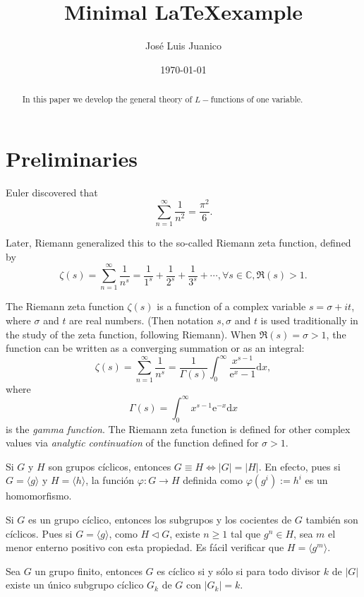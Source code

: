 \documentclass{article}
\title{Minimal \LaTeX example}
\author{José Luis Juanico}
\date{\today}
\begin{document}
\maketitle
\begin{abstract}
    \noindent In this paper we develop the general theory of $L-$functions of one variable. \lipsum[1][1-3]
\end{abstract}

\section{Preliminaries}

Euler discovered that
\begin{equation}
    \sum_{n=1}^{\infty} \frac{1}{n^2} = \frac{\pi^2}{6}.
\end{equation}

Later, Riemann generalized this to the so-called Riemann zeta function, defined by
\begin{equation}
    \zeta(s) = \sum_{n=1}^{\infty} \frac{1}{n^s} = \frac{1}{1^s}+\frac{1}{2^s}+\frac{1}{3^s}+\cdots, \forall s \in \mathbb{C}, \Re(s) > 1.
\end{equation}

The Riemann zeta function $\zeta(s)$ is a function of a complex variable $s=\sigma+i t$, where $\sigma$ and $t$ are real numbers. (Then notation $s,\sigma$ and $t$ is used traditionally in the study of the zeta function, following Riemann). When $\Re(s)=\sigma>1$, the function can be written as a converging summation or as an integral:
\begin{equation}
    \zeta(s) = \sum_{n=1}^{\infty} \frac{1}{n^s} = \frac{1}{\Gamma(s)} \int_{0}^{\infty} \frac{x^{s-1}}{\mathrm{e}^x-1} \mathrm{d} x,
\end{equation}
where
\begin{equation}
    \Gamma(s) = \int_{0}^{\infty} x^{s-1} \mathrm{e}^{-x} \mathrm{d} x
\end{equation}
is the \emph{gamma function}. The Riemann zeta function is defined for other complex values via \textit{analytic continuation} of the function defined for $\sigma>1$.

Si $G$ y $H$ son grupos cíclicos, entonces $G \equiv H \iff |G| = |H|$. En efecto, pues si $G = \langle g \rangle$ y $H = \langle h \rangle$, la función $\varphi: G \longrightarrow H$ definida como $\varphi(g^i) := h^i$ es un homomorfismo.

Si $G$ es un grupo cíclico, entonces los subgrupos y los cocientes de $G$ también son cíclicos. Pues si $G = \langle g \rangle$, como $H \vartriangleleft G$, existe $n \ge 1$ tal que $g^n \in H$, sea $m$ el menor enterno positivo con esta propiedad. Es fácil verificar que $H = \langle g^m \rangle$.

Sea $G$ un grupo finito, entonces $G$ es cíclico si y sólo si para todo divisor $k$ de $|G|$ existe un  único subgrupo cíclico $G_k$ de $G$ con $|G_k| = k$.
\end{document}
